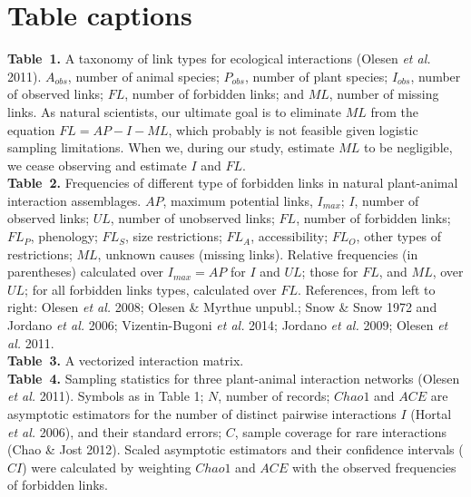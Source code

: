 \documentclass[12pt]{article}
\begin{document}
\section*{Table captions}
\noindent \textbf{Table~1.} A taxonomy of link types for ecological interactions (Olesen \emph{et al.} 2011). $A_{obs}$, number of animal species; $P_{obs}$, number of plant species; $I_{obs}$, number of observed links; $FL$, number of forbidden links; and $ML$, number of missing links. As natural scientists, our ultimate goal is to eliminate $ML$ from the equation $FL = AP - I - ML$, which probably is not feasible given logistic sampling limitations. When we, during our study, estimate $ML$ to be negligible, we cease observing and estimate $I$ and $FL$.\\

\noindent \textbf{Table~2.} Frequencies of different type of forbidden links in natural plant-animal interaction assemblages. $AP$, maximum potential links, $I_{max}$; $I$, number of observed links; $UL$, number of unobserved links; $FL$, number of forbidden links; $FL_P$, phenology; $FL_S$, size restrictions; $FL_A$, accessibility; $FL_O$, other types of restrictions; $ML$, unknown causes (missing links). Relative frequencies (in parentheses) calculated over $I_{max}= AP$ for $I$ and $UL$; those for $FL$, and $ML$, over $UL$; for all forbidden links types, calculated over $FL$. References, from left to right: Olesen \emph{et al.} 2008; Olesen \& Myrthue unpubl.; Snow \& Snow 1972 and Jordano \emph{et al.} 2006; Vizentin-Bugoni \emph{et al.} 2014; Jordano \emph{et al.} 2009; Olesen \emph{et al.} 2011.  \\

\noindent \textbf{Table~3.} A vectorized interaction matrix.\\

\noindent \textbf{Table~4.} Sampling statistics for three plant-animal interaction networks (Olesen \emph{et al.} 2011). Symbols as in Table 1; $N$, number of records; $Chao1$ and $ACE$ are asymptotic estimators for the number of distinct pairwise interactions $I$ (Hortal \emph{et al.} 2006), and their standard errors; $C$, sample coverage for rare interactions (Chao \& Jost 2012). Scaled asymptotic estimators and their confidence intervals ($CI$) were calculated by weighting $Chao1$ and $ACE$ with the observed frequencies of forbidden links. \\
%
\end{document}

